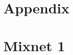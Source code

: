 \documentclass[preprint,12pt,3p]{elsarticle}
\begin{document}
\appendix
\section{Appendix}




\section{Mixnet 1}
\end{document}
